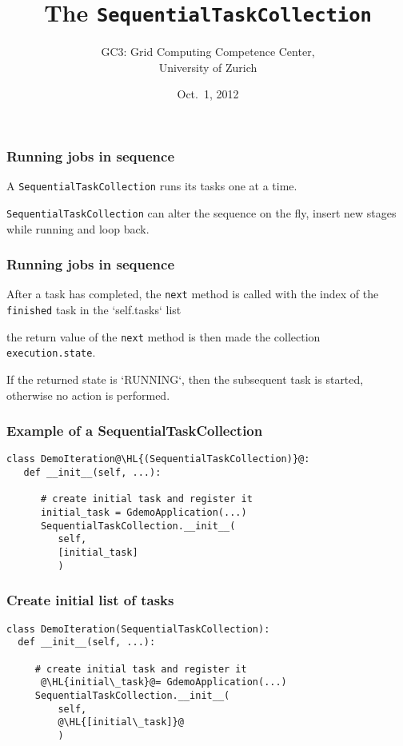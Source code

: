 \documentclass[english,serif,mathserif,xcolor=pdftex,dvipsnames,table]{beamer}
\title{%
  The \texttt{SequentialTaskCollection}
}
\author[Sergio Maffioletti]{%
  GC3: Grid Computing Competence Center, \\
  University of Zurich
}
\date{Oct.~1, 2012}
\begin{document}
\maketitle

\begin{frame}
  \frametitle{Running jobs in sequence}
  \begin{block}{}
    A \texttt{SequentialTaskCollection} runs its tasks one at a time.
  \end{block}
  \begin{block}{}
    \texttt{SequentialTaskCollection} can alter the sequence
    on the fly, insert new stages while running and loop
    back.
  \end{block}
\end{frame}

\begin{frame}
  \frametitle{Running jobs in sequence}
  \begin{block}{}
    After a task has completed, the \texttt{next} method is called with the
    index of the \texttt{finished} task in the `self.tasks` list
  \end{block}
  \begin{block}{}
    the return value of the \texttt{next} method is then made the collection
    \texttt{execution.state}.
  \end{block}

  \begin{block}{}
    If the returned state is `RUNNING`, then the
    subsequent task is started, otherwise no action is performed.
  \end{block}
\end{frame}

\begin{frame}[fragile]
\frametitle{Example of a SequentialTaskCollection}
\begin{lstlisting}
class DemoIteration@\HL{(SequentialTaskCollection)}@:
   def __init__(self, ...):

      # create initial task and register it
      initial_task = GdemoApplication(...)
      SequentialTaskCollection.__init__(
         self,
         [initial_task]
         )
      \end{lstlisting}
\end{frame}

\begin{frame}[fragile]
\frametitle{Create initial list of tasks}
  \begin{lstlisting}
class DemoIteration(SequentialTaskCollection):
  def __init__(self, ...):

     # create initial task and register it
      @\HL{initial\_task}@= GdemoApplication(...)
     SequentialTaskCollection.__init__(
         self,
         @\HL{[initial\_task]}@
         )
  \end{lstlisting}
\end{frame}
\end{document}
